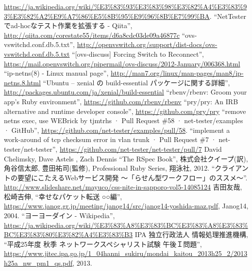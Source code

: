 \begin{thebibliography}{99}
         \url{https://ja.wikipedia.org/wiki/%E3%83%93%E3%83%98%E3%82%A4%E3%83%93%E3%82%A2%E9%A7%86%E5%8B%95%E9%96%8B%E7%99%BA}.
         ``NetTesterでad-hocなテスト作業を拡張する - Qiita'',
         \url{http://qiita.com/corestate55/items/d6a8cdc03de09a46877c}
         ``ovs-vswitchd.conf.db.5.txt'',
         \url{http://openvswitch.org/support/dist-docs/ovs-vswitchd.conf.db.5.txt}
         ``[ovs-discuss] Forcing Switch to Reconnect'',
         \url{https://mail.openvswitch.org/pipermail/ovs-discuss/2012-January/006368.html}
         ``ip-netns(8) - Linux manual page'',
         \url{http://man7.org/linux/man-pages/man8/ip-netns.8.html}
         ``Ubuntu – xenial の build-essential パッケージに関する詳細'',
         \url{http://packages.ubuntu.com/ja/xenial/build-essential}
         ``rbenv/rbenv: Groom your app’s Ruby environment'',
         \url{https://github.com/rbenv/rbenv}
         ``pry/pry: An IRB alternative and runtime developer console'',
         \url{https://github.com/pry/pry}
  ``remove netns exec, use WEBrick by tjmtrhs ·
         Pull Request \#58 · net-tester/examples · GitHub'',
         \url{https://github.com/net-tester/examples/pull/58}.
  ``implement a work-around of tcp checksum
         error in vlan trunk · Pull Request \#7 ·
         net-tester/net-tester'',
         \url{https://github.com/net-tester/net-tester/pull/7}
  David Chelimsky, Dave Astels , Zach Dennis ``The
         RSpec Book'', 株式会社クイープ(訳), 角谷信太郎, 豊田祐司(監修),
         Professional Ruby Series, 翔泳社, 2012.
         ``クライアントの要望にこたえるWebサービス開発 ～「らせん型ワークフロー」のススメ～''.
         \url{http://www.slideshare.net/mayuco/css-nite-in-sapporo-vol5-14085124}
         吉田友哉, 松崎吉伸,
         ``幸せなパケット転送 ○○編'',
         \url{https://www.janog.gr.jp/meeting/janog14/src/janog14-yoshida-maz.pdf},
         Janog14, 2004.
         ``ヨーヨーダイン - Wikipedia'',
         \url{https://ja.wikipedia.org/wiki/\%E3\%83\%A8\%E3\%83\%BC\%E3\%83\%A8\%E3\%83\%BC\%E3\%83\%80\%E3\%82\%A4\%E3\%83\%B3}
         IPA 独立行政法人 情報処理推進機構,
         ``平成25年度 秋季 ネットワークスペシャリスト試験 午後Ｉ問題'',
         \url{https://www.jitec.ipa.go.jp/1_04hanni_sukiru/mondai_kaitou_2013h25_2/2013h25a_nw_pm1_qs.pdf}, 2013.

\end{thebibliography}
